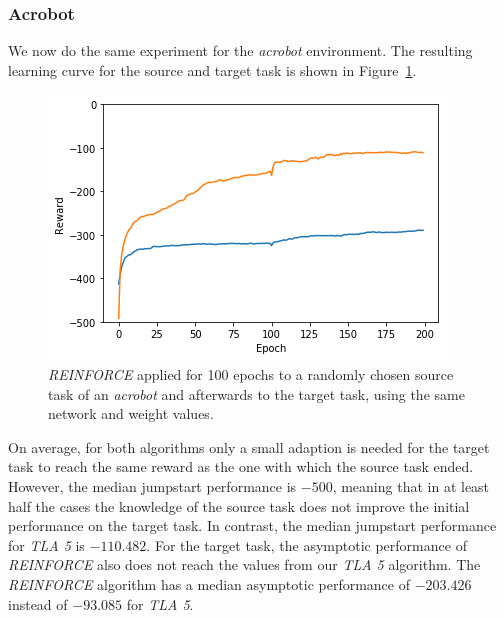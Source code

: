 \subsubsection{Acrobot} %
\label{ssub:reinforce_source_target:acrobot}
We now do the same experiment for the \textit{acrobot} environment. The resulting learning curve for the source and target task is shown in Figure~\ref{fig:acrobot:reward_reinforce_2tasks}.
\begin{figure}[htb]
    \centering
    \includegraphics[width=.8\linewidth]{images/results/Acrobot/reinforce_2tasks.png}
    \caption{\textit{REINFORCE} applied for 100 epochs to a randomly chosen source task of an \textit{acrobot} and afterwards to the target task, using the same network and weight values.}
    \label{fig:acrobot:reward_reinforce_2tasks}
\end{figure}
On average, for both algorithms only a small adaption is needed for the target task to reach the same reward as the one with which the source task ended. However, the median jumpstart performance is $-500$, meaning that in at least half the cases the knowledge of the source task does not improve the initial performance on the target task. In contrast, the median jumpstart performance for \textit{TLA 5} is $-110.482$. For the target task, the asymptotic performance of \textit{REINFORCE} also does not reach the values from our \textit{TLA 5} algorithm. The \textit{REINFORCE} algorithm has a median asymptotic performance of $-203.426$ instead of $-93.085$ for \textit{TLA 5}.

